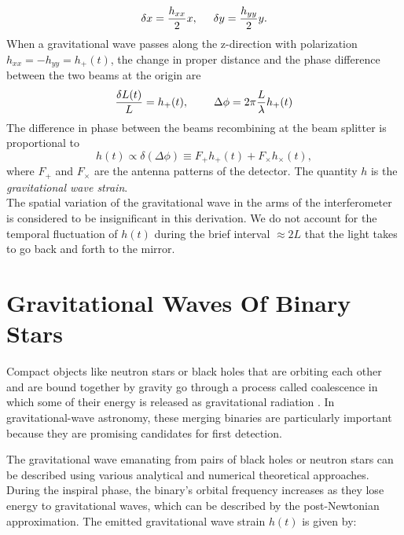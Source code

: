 \begin{equation}
    \delta x = \frac{h_{xx}}{2}x, \hspace{0.5cm} \delta y = \frac{h_{yy}}{2}y.
\end{equation}
When a gravitational wave passes along the z-direction with polarization $h_{xx} = -h_{yy} = h_{+}(t)$, the change in proper distance and the phase difference between the two beams at the origin are
\begin{equation}
    \frac{\delta L(t)}{L} = h_{+}(t), \hspace{0.8cm} \Delta \phi = 2\pi \frac{L}{\lambda}h_{+}(t)
\end{equation}
The difference in phase between the beams recombining at the beam splitter is proportional to
\begin{equation}
    h(t) \propto \delta (\Delta \phi) \equiv F_{+}h_{+}(t) + F_{\times}h_{\times}(t),
\end{equation}
where $F_{+}$ and $F_{\times}$ are the antenna patterns of the detector. The quantity $h$ is the \emph{gravitational wave strain}.\\
The spatial variation of the gravitational wave in the arms of the interferometer is considered to be insignificant in this derivation. We do not account for the temporal fluctuation of $h(t)$ during the brief interval $\approx 2L$ that the light takes to go back and forth to the mirror. 


\section{Gravitational Waves Of Binary Stars}
Compact objects like neutron stars or black holes that are orbiting each other and are bound together by gravity go through a process called coalescence in which some of their energy is released as gravitational radiation \citep{Blanchet_2002}\citep{coalesence}\citep{thesis}. In gravitational-wave astronomy, these merging binaries are particularly important because they are promising candidates for first detection.

The gravitational wave emanating from pairs of black holes or neutron stars can be described using various analytical and numerical theoretical approaches. During the inspiral phase, the binary's orbital frequency increases as they lose energy to gravitational waves, which can be described by the post-Newtonian approximation. The emitted gravitational wave strain \( h(t) \) \citep{Blanchet_2002}\citep{Hughes_2009} is given by:

